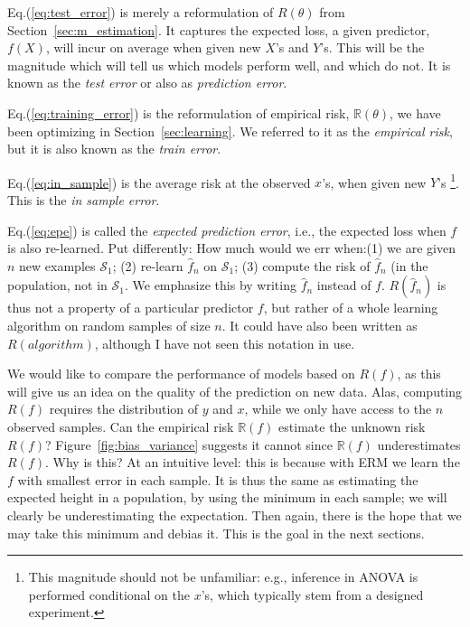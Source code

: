 \documentclass[12pt,a4paper]{article}
\theoremstyle{plain}
\theoremstyle{definition}
\newcommand{\risk}{R}
\newcommand{\riskn}{\mathbb{R}}
\newcommand{\hyp}{f}
\newcommand{\sample}{\mathcal{S}}
\newcommand{\test}{\risk(\hyp)}
\newcommand{\train}{\riskn(\hyp)}
\newcommand{\EPE}{\risk(\hat{\hyp}_n)}
\begin{document}
Eq.(\ref{eq:test_error}) is merely a reformulation of $\risk(\theta)$ from Section~\ref{sec:m_estimation}.
It captures the expected loss, a given predictor, $\hyp(X)$, will incur on average when given new $X$'s and $Y$'s.
This will be the magnitude which will tell us which models perform well, and which do not.
It is known as the \emph{test error} or also as \emph{prediction error}.

Eq.(\ref{eq:training_error}) is the reformulation of empirical risk, $\riskn(\theta)$, we have been optimizing in Section~\ref{sec:learning}.
We referred to it as the \emph{empirical risk}, but it is also known as the \emph{train error}.

Eq.(\ref{eq:in_sample}) is the average risk at the observed $x$'s, when given new $Y$'s \footnote{This magnitude should not be unfamiliar: e.g., inference in ANOVA is performed conditional on the $x$'s, which typically stem from a designed experiment.}.
This is the \emph{in sample error}.

Eq.(\ref{eq:epe}) is called the \emph{expected prediction error}, i.e., the expected loss when $\hyp$ is also re-learned. 
Put differently: How much would we err when:(1) we are given $n$ new examples $\sample_1$; (2) re-learn $\hat{\hyp}_n$ on $\sample_1$; (3) compute the risk of $\hat{\hyp}_n$ (in the population, not in $\sample_1$.
We emphasize this by writing $\hat{\hyp}_n$ instead of $\hyp$.
$\EPE$ is thus not a property of a particular predictor $\hyp$, but rather of a whole learning algorithm on random samples of size $n$.
It could have also been written as $\risk(algorithm)$, although I have not seen this notation in use.


We would like to compare the performance of models based on $\test$, as this will give us an idea on the quality of the prediction on new data. 
Alas, computing $\test$ requires the distribution of $y$ and $x$, while we only have access to the $n$ observed samples.
Can the empirical risk $\train$ estimate the unknown risk $\test$? 
Figure~\ref{fig:bias_variance} suggests it cannot since $\train$ underestimates $\test$.
Why is this?
At an intuitive level: this is because with ERM we learn the $\hyp$ with smallest error in each sample.
It is thus the same as estimating the expected height in a population, by using the minimum in each sample; we will clearly be underestimating the expectation. Then again, there is the hope that we may take this minimum and debias it. 
This is the goal in the next sections.
\end{document}
